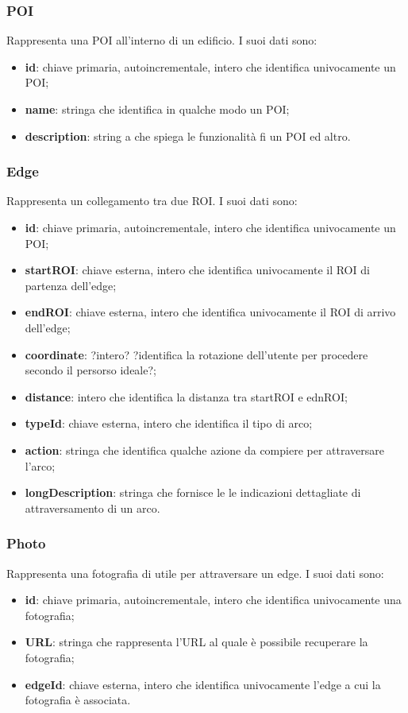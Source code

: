 \documentclass[../SpecificaTecnica.tex]{subfiles}
\begin{document}
		\subsubsection{POI}
			Rappresenta una POI all'interno di un edificio. I suoi dati sono:
			\begin{itemize}
				\item \textbf{id}: chiave primaria, autoincrementale, intero che identifica univocamente un POI;
				\item \textbf{name}: stringa che identifica in qualche modo un POI;
				\item \textbf{description}: string a che spiega le funzionalità fi un POI ed altro.
			\end{itemize}
		\subsubsection{Edge}
			Rappresenta un collegamento tra due ROI. I suoi dati sono:
			\begin{itemize}
				\item \textbf{id}: chiave primaria, autoincrementale, intero che identifica univocamente un POI;
				\item \textbf{startROI}: chiave esterna, intero che identifica univocamente il ROI di partenza dell'edge;
				\item \textbf{endROI}: chiave esterna, intero che identifica univocamente il ROI di arrivo dell'edge;
				\item \textbf{coordinate}: ?intero? ?identifica la rotazione dell'utente per procedere secondo il persorso ideale?;
				\item \textbf{distance}: intero che identifica la distanza tra startROI e ednROI;
				\item \textbf{typeId}: chiave esterna, intero che identifica il tipo di arco;
				\item \textbf{action}: stringa che identifica qualche azione da compiere per attraversare l'arco;
				\item \textbf{longDescription}: stringa che fornisce le le indicazioni dettagliate di attraversamento di un arco.
			\end{itemize}
		\subsubsection{Photo}
			Rappresenta una fotografia di utile per attraversare un edge. I suoi dati sono:
			\begin{itemize}
				\item \textbf{id}: chiave primaria, autoincrementale, intero che identifica univocamente una fotografia;
				\item \textbf{URL}: stringa che rappresenta l'URL al quale è possibile recuperare la fotografia;
				\item \textbf{edgeId}: chiave esterna, intero che identifica univocamente l'edge a cui la fotografia è associata.
			\end{itemize}
\end{document}
